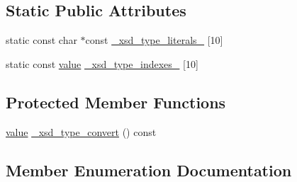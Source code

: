 \subsection*{Static Public Attributes}
\begin{DoxyCompactItemize}
\item 
static const char $\ast$const \hyperlink{classtype_a2e3db93564deb68a52e1e54dcb82b41f}{\+\_\+xsd\+\_\+type\+\_\+literals\+\_\+} \mbox{[}10\mbox{]}
\item 
static const \hyperlink{classtype_a83781d700ce124b4224c316326a5a975}{value} \hyperlink{classtype_a847b5fec369eccdbbed240c3a7fcc7a5}{\+\_\+xsd\+\_\+type\+\_\+indexes\+\_\+} \mbox{[}10\mbox{]}
\end{DoxyCompactItemize}
\subsection*{Protected Member Functions}
\begin{DoxyCompactItemize}
\item 
\hyperlink{classtype_a83781d700ce124b4224c316326a5a975}{value} \hyperlink{classtype_ac8957cf4dadb290d74730be2812f4754}{\+\_\+xsd\+\_\+type\+\_\+convert} () const 
\end{DoxyCompactItemize}


\subsection{Member Enumeration Documentation}
